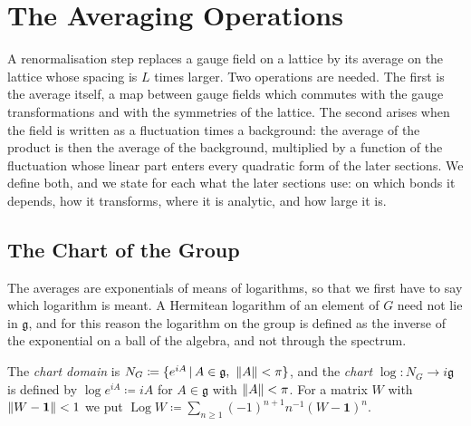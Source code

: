 \documentclass[11pt]{preprint}
\newcommand{\id}{\mathbf 1}
\DeclarePairedDelimiter{\norm}{\lVert}{\rVert}
\numberwithin{equation}{section}
\begin{document}
\section{The Averaging Operations}\label{sec:averaging}

A renormalisation step replaces a gauge field on a lattice by its average on the lattice whose spacing is $L$ times larger. Two operations are needed. The first is the average itself, a map between gauge fields which commutes with the gauge transformations and with the symmetries of the lattice. The second arises when the field is written as a fluctuation times a background: the average of the product is then the average of the background, multiplied by a function of the fluctuation whose linear part enters every quadratic form of the later sections. We define both, and we state for each what the later sections use: on which bonds it depends, how it transforms, where it is analytic, and how large it is.

\subsection{The Chart of the Group}\label{sec:chart}

The averages are exponentials of means of logarithms, so that we first have to say which logarithm is meant. A Hermitean logarithm of an element of $G$ need not lie in $\mathfrak g$, and for this reason the logarithm on the group is defined as the inverse of the exponential on a ball of the algebra, and not through the spectrum.

\begin{definition}\label{def:chart}
The \emph{chart domain} is $N_G \coloneqq \{ e^{iA} \,|\, A \in \mathfrak g,\ \norm A < \pi \}$, and the \emph{chart} $\log \colon N_G \to i\mathfrak g$ is defined by $\log e^{iA} \coloneqq iA$ for $A \in \mathfrak g$ with $\norm A < \pi$. For a matrix $W$ with $\norm{W - \id} < 1$ we put $\operatorname{Log}W \coloneqq \sum_{n \geqslant 1}(-1)^{n+1}n^{-1}(W - \id)^n$.
\end{definition}
\end{document}
